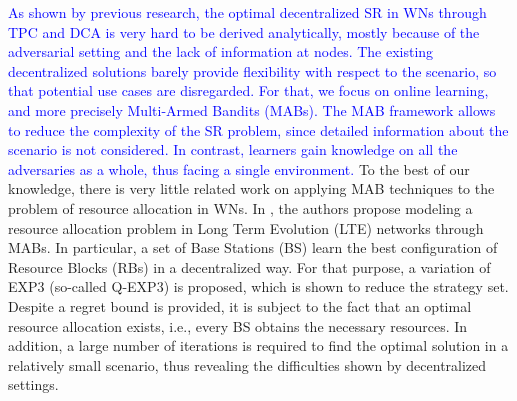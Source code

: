 \documentclass[preprint,12pt]{elsarticle}
\begin{document}
	\textcolor{blue}{\textcolor{blue}{As shown by previous research, the optimal decentralized SR in WNs through TPC and DCA is very hard to be derived analytically, mostly because of the adversarial setting and the lack of information at nodes. The existing decentralized solutions barely provide flexibility with respect to the scenario, so that potential use cases are disregarded.} For that, we focus on online learning, and more precisely Multi-Armed Bandits (MABs). The MAB framework allows to reduce the complexity of the SR problem, since detailed information about the scenario is not considered. In contrast, learners gain knowledge on all the adversaries as a whole, thus facing a single environment.} To the best of our knowledge, there is very little related work on applying MAB techniques to the problem of resource allocation in WNs. In \cite{coucheney2015multi}, the authors propose modeling a resource allocation problem in Long Term Evolution (LTE) networks through MABs. In particular, a set of Base Stations (BS) learn the best configuration of Resource Blocks (RBs) in a decentralized way. For that purpose, a variation of EXP3 (so-called Q-EXP3) is proposed, which is shown to reduce the strategy set. Despite a regret bound is provided, it is subject to the fact that an optimal resource allocation exists, i.e., every BS obtains the necessary resources. In addition, a large number of iterations is required to find the optimal solution in a relatively small scenario, thus revealing the difficulties shown by decentralized settings.
	
\end{document}
